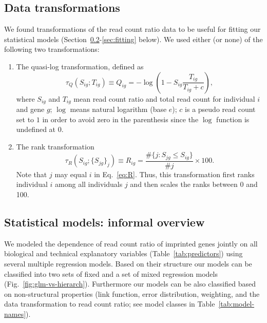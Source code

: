 \documentclass[letterpaper]{article}
\begin{document}
\subsection{Data transformations}

We found transformations of the read count ratio data to be useful for fitting
our statistical models
(Section~\ref{sec:regression-overview-informal}-\ref{sec:fitting} below).
We used either (or none) of the following two transformations:

\begin{enumerate}
\item
The quasi-log transformation, defined as
\begin{equation}
\tau_Q(S_{ig};T_{ig}) \equiv Q_{ig} = - \log \left( 1 - S_{ig} \frac{T_{ig}}{T_{ig} + c}
\right),
\label{eq:Q}
\end{equation}
where \(S_{ig}\) and \(T_{ig}\) mean read count ratio and total read count for
individual \(i\) and gene \(g\);
\(\log\) means natural logarithm (base \(e\));  \(c\) is a pseudo read
count set to \(1\) in order to avoid zero in the parenthesis since the \(\log\)
function is undefined at \(0\).
\item 
The rank transformation
\begin{equation}
\tau_R(S_{ig};\{S_{jg}\}_j) \equiv R_{ig} = \frac{\# \{j: S_{jg}\le S_{ig}
\}}{\# j} \times 100.
\label{eq:R}
\end{equation}
Note that \(j\) may equal \(i\) in Eq.~\ref{eq:R}.
Thus, this transformation first ranks individual \(i\) among all individuals
\(j\) and then scales the ranks between 0 and 100.
\end{enumerate}

\subsection{Statistical models: informal overview}
\label{sec:regression-overview-informal}

We modeled the dependence of read count ratio of imprinted genes jointly on
all biological and technical explanatory variables
(Table~\ref{tab:predictors}) using several multiple regression models.  Based
on their structure our models can be classified into two sets of fixed and a
set of mixed regression models (Fig.~\ref{fig:glm-vs-hierarch}).  Furthermore
our models can be also classified based on non-structural properties (link
function, error distribution, weighting, and the data transformation to read
count ratio; see model classes in Table~\ref{tab:model-names}).
\end{document}
